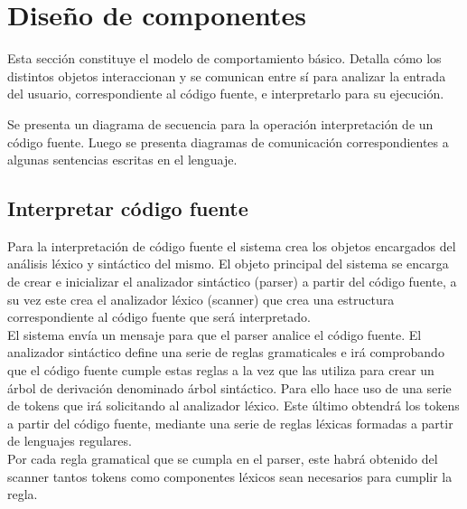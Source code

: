 \section{Diseño de componentes}
Esta sección constituye el modelo de comportamiento básico.
Detalla cómo los distintos objetos interaccionan y se comunican entre sí para
analizar la entrada del usuario, correspondiente al código fuente, e interpretarlo
para su ejecución.

Se presenta un diagrama de secuencia para la operación interpretación
de un código fuente. Luego se presenta diagramas de comunicación correspondientes
a algunas sentencias escritas en el lenguaje.


\subsection{Interpretar código fuente}
Para la interpretación de código fuente el sistema crea los objetos 
encargados del análisis léxico y sintáctico del mismo. El objeto principal
del sistema se encarga de crear e inicializar el analizador sintáctico (parser) a
partir del código fuente, a su vez este crea el analizador léxico (scanner)
que crea una estructura correspondiente al código fuente que será interpretado.\\

El sistema envía un mensaje para que el parser analice el código fuente.
El analizador sintáctico define una serie de reglas gramaticales e irá comprobando que 
el código fuente cumple estas reglas a la vez que las utiliza para crear un árbol de derivación 
denominado árbol sintáctico. Para ello hace uso de una serie de tokens que irá solicitando 
al analizador léxico. Este último obtendrá los tokens a partir del código fuente, mediante 
una serie de reglas léxicas formadas a partir de lenguajes regulares. \\


Por cada regla gramatical que se cumpla en el parser, este habrá obtenido del scanner tantos tokens como 
componentes léxicos sean necesarios para cumplir la regla. 

